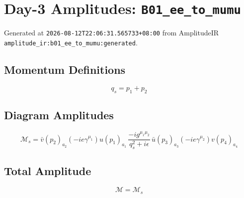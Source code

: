 \documentclass[11pt]{article}
\begin{document}
\section*{Day-3 Amplitudes: \texttt{B01\_ee\_to\_mumu}}
Generated at \texttt{2026-08-12T22:06:31.565733+08:00} from AmplitudeIR \texttt{amplitude\_ir:b01\_ee\_to\_mumu:generated}.

\subsection*{Momentum Definitions}
\[q_{s} = p_{1}+p_{2}\]

\subsection*{Diagram Amplitudes}
\begin{equation}
\mathcal{M}_{s} = \bar v(p_{2})_{a_{2}}\left(-i e \gamma^{\mu_{1}}\right)u(p_{1})_{a_{1}} \, \frac{-i g^{\mu_{1}\mu_{2}}}{q_{s}^2+i\epsilon} \, \bar u(p_{3})_{a_{3}}\left(-i e \gamma^{\mu_{2}}\right)v(p_{4})_{a_{4}}
\end{equation}

\subsection*{Total Amplitude}
\begin{equation}
\mathcal{M} = \mathcal{M}_{s}
\end{equation}
\end{document}
